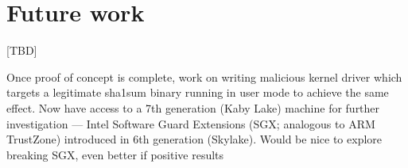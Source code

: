 \section{Future work}
\label{sec:future}

[TBD]

Once proof of concept is complete, work on writing malicious kernel driver
which targets a legitimate sha1sum binary running in user mode to achieve the
same effect.
Now have access to a 7th generation (Kaby Lake) machine for further
investigation — Intel Software Guard Extensions (SGX; analogous to ARM
TrustZone) introduced in 6th generation (Skylake).
Would be nice to explore breaking SGX, even better if positive results
